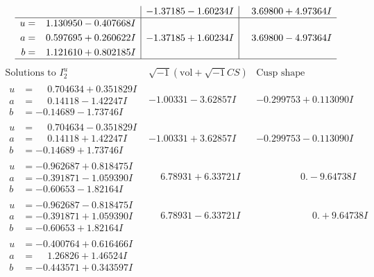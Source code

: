 \documentclass[1p]{elsarticle_modified}
\theoremstyle{definition}
\newcommand{\I}{\sqrt{-1}}
\begin{document}
$$\begin{array}{c|c|c}
 & -1.37185 - 1.60234 I & \phantom{-}3.69800 + 4.97364 I \\ \hline\begin{aligned}
u &= \phantom{-}1.130950 - 0.407668 I \\
a &= \phantom{-}0.597695 + 0.260622 I \\
b &= \phantom{-}1.121610 + 0.802185 I\end{aligned}
 & -1.37185 + 1.60234 I & \phantom{-}3.69800 - 4.97364 I\\
 \hline 
 \end{array}$$\newpage$$\begin{array}{c|c|c}  
\text{Solutions to }I^u_{2}& \I (\text{vol} + \sqrt{-1}CS) & \text{Cusp shape}\\
 \hline 
\begin{aligned}
u &= \phantom{-}0.704634 + 0.351829 I \\
a &= \phantom{-}0.14118 - 1.42247 I \\
b &= -0.14689 - 1.73746 I\end{aligned}
 & -1.00331 - 3.62857 I & -0.299753 + 0.113090 I \\ \hline\begin{aligned}
u &= \phantom{-}0.704634 - 0.351829 I \\
a &= \phantom{-}0.14118 + 1.42247 I \\
b &= -0.14689 + 1.73746 I\end{aligned}
 & -1.00331 + 3.62857 I & -0.299753 - 0.113090 I \\ \hline\begin{aligned}
u &= -0.962687 + 0.818475 I \\
a &= -0.391871 - 1.059390 I \\
b &= -0.60653 - 1.82164 I\end{aligned}
 & \phantom{-}6.78931 + 6.33721 I & \phantom{-0.000000 } 0. - 9.64738 I \\ \hline\begin{aligned}
u &= -0.962687 - 0.818475 I \\
a &= -0.391871 + 1.059390 I \\
b &= -0.60653 + 1.82164 I\end{aligned}
 & \phantom{-}6.78931 - 6.33721 I & \phantom{-0.000000 -}0. + 9.64738 I \\ \hline\begin{aligned}
u &= -0.400764 + 0.616466 I \\
a &= \phantom{-}1.26826 + 1.46524 I \\
b &= -0.443571 + 0.343597 I\end{aligned}

\end{array}$$
\end{document}
